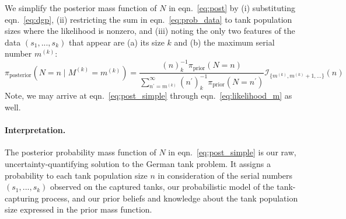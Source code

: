\documentclass[11pt, oneside]{article}
\newcommand{\data}{$(s_1, ..., s_k)$\xspace}
\DeclareRobustCommand{\cms}[1]{ {\begingroup\sethlcolor{fruitpushorange}\hl{(cms:) #1}\endgroup} }
\begin{document}
We simplify the posterior mass function of $N$ in eqn.~\ref{eq:post} by (i) substituting eqn.~\ref{eq:dgp}, (ii) restricting the sum in eqn.~\ref{eq:prob_data} to tank population sizes where the likelihood is nonzero, and (iii) noting the only two features of the data \data that appear are (a) its size $k$ and (b) the maximum serial number $m^{(k)}$:
\begin{equation}
	\pi_{\text{posterior}}(N=n \mid M^{(k)}=m^{(k)}) = 
	\frac{
		\displaystyle (n)_k^{-1} \pi_{\text{prior}}(N=n)
	}{
		\displaystyle \sum_{n^\prime=m^{(k)}}^\infty (n^\prime)_{k}^{-1}  \pi_{\text{prior}}(N=n^\prime)
	}
	\mathcal{I}_{\{m^{(k)}, m^{(k)}+1,...\}}(n)
	\label{eq:post_simple}
\end{equation}
Note, we may arrive at eqn.~\ref{eq:post_simple} through eqn.~\ref{eq:likelihood_m} as well.

\paragraph{Interpretation.}
The posterior probability mass function of $N$ in eqn.~\ref{eq:post_simple} is our raw, uncertainty-quantifying solution to the German tank problem. It assigns a probability to each tank population size $n$ in consideration of the serial numbers \data observed on the captured tanks, our probabilistic model of the tank-capturing process, and our prior beliefs and knowledge about the tank population size expressed in the prior mass function.

\end{document}
